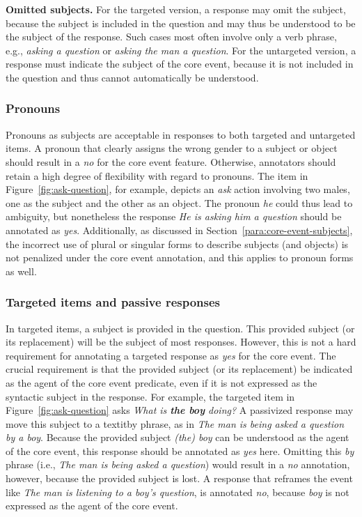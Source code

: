\documentclass[12pt]{article}
\begin{document}
\textbf{Omitted subjects.} For the targeted version, a response may omit the subject, because the subject is included in the question and may thus be understood to be the subject of the response. Such cases most often involve only a verb phrase, e.g., \textit{asking a question} or \textit{asking the man a question}. For the untargeted version, a response must indicate the subject of the core event, because it is not included in the question and thus cannot automatically be understood.

\subsubsection{Pronouns} Pronouns as subjects are acceptable in responses to both targeted and untargeted items. A pronoun that clearly assigns the wrong gender to a subject or object should result in a \textit{no} for the core event feature. Otherwise, annotators should retain a high degree of flexibility with regard to pronouns. The item in Figure~\ref{fig:ask-question}, for example, depicts an \textit{ask} action involving two males, one as the subject and the other as an object. The pronoun \textit{he} could thus lead to ambiguity, but nonetheless the response \textit{He is asking him a question} should be annotated as \textit{yes}. Additionally, as discussed in Section~\ref{para:core-event-subjects}, the incorrect use of plural or singular forms to describe subjects (and objects) is not penalized under the core event annotation, and this applies to pronoun forms as well. 

\subsubsection{Targeted items and passive responses} \label{sec:core-targeted} In targeted items, a subject is provided in the question. This provided subject (or its replacement) will be the subject of most responses. However, this is not a hard requirement for annotating a targeted response as \textit{yes} for the core event. The crucial requirement is that the provided subject (or its replacement) be indicated as the agent of the core event predicate, even if it is not expressed as the syntactic subject in the response. For example, the targeted item in Figure~\ref{fig:ask-question} asks \textit{What is \textbf{the boy} doing?} A passivized response may move this subject to a textit{by} phrase, as in \textit{The man is being asked a question by a boy}. Because the provided subject \textit{(the) boy} can be understood as the agent of the core event, this response should be annotated as \textit{yes} here. Omitting this \textit{by} phrase (i.e., \textit{The man is being asked a question}) would result in a \textit{no} annotation, however, because the provided subject is lost. 
A response that reframes the event like \textit{The man is listening to a boy's question}, is annotated \textit{no}, because \textit{boy} is not expressed as the agent of the core event. 
\end{document}
